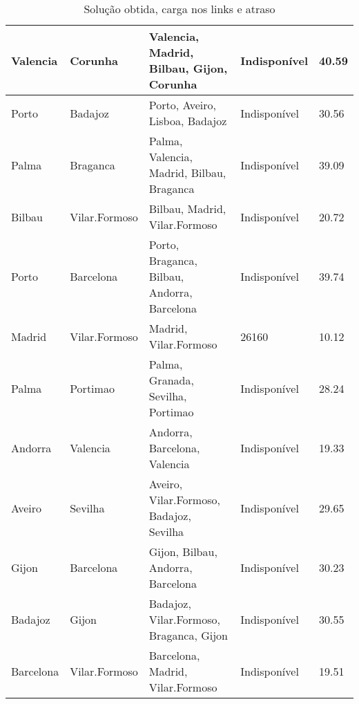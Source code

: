 \begin{table}[!htb]
{\begin{tabular}{|l|l|l|l|l|}
Valencia & Corunha & Valencia, Madrid, Bilbau, Gijon, Corunha & Indisponível & 40.59 \\ \hline
Porto & Badajoz & Porto, Aveiro, Lisboa, Badajoz & Indisponível & 30.56 \\ \hline
Palma & Braganca & Palma, Valencia, Madrid, Bilbau, Braganca & Indisponível & 39.09 \\ \hline
Bilbau & Vilar.Formoso & Bilbau, Madrid, Vilar.Formoso & Indisponível & 20.72 \\ \hline
Porto & Barcelona & Porto, Braganca, Bilbau, Andorra, Barcelona & Indisponível & 39.74 \\ \hline
Madrid & Vilar.Formoso & Madrid, Vilar.Formoso & 26160 & 10.12 \\ \hline
Palma & Portimao & Palma, Granada, Sevilha, Portimao & Indisponível & 28.24 \\ \hline
Andorra & Valencia & Andorra, Barcelona, Valencia & Indisponível & 19.33 \\ \hline
Aveiro & Sevilha & Aveiro, Vilar.Formoso, Badajoz, Sevilha & Indisponível & 29.65 \\ \hline
Gijon & Barcelona & Gijon, Bilbau, Andorra, Barcelona & Indisponível & 30.23 \\ \hline
Badajoz & Gijon & Badajoz, Vilar.Formoso, Braganca, Gijon & Indisponível & 30.55 \\ \hline
Barcelona & Vilar.Formoso & Barcelona, Madrid, Vilar.Formoso & Indisponível & 19.51 \\ \hline
\end{tabular}}
\caption[]{Solução obtida, carga nos links e atraso}
\end{table}

